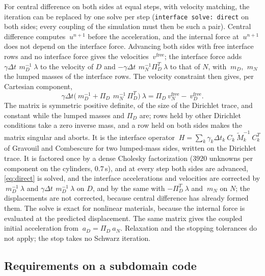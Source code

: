 \documentclass[11pt]{article}
\newcommand{\code}[1]{\texttt{#1}}
\begin{document}
For central difference on both sides at equal steps, with velocity
matching, the iteration can be replaced by one solve per step
(\code{interface solve: direct} on both sides; every coupling of the
simulation must then be such a pair). Central difference computes
$~u^{n+1}$ before the acceleration, and the internal force at $~u^{n+1}$
does not depend on the interface force. Advancing both sides with free
interface rows and no interface force gives the velocities
$~v^{\mathrm{free}}$; the interface force adds
$\gamma \Delta t\, ~m_D^{-1}~\lambda$ to the velocity of $D$ and
$-\gamma\Delta t\, ~m_N^{-1}\Pi_D^T ~\lambda$ to that of $N$, with $~m_D$,
$~m_N$ the lumped masses of the interface rows. The velocity constraint
then gives, per Cartesian component,
\begin{equation}
  \gamma \Delta t \bigl(~m_D^{-1} + \Pi_D\, ~m_N^{-1}\, \Pi_D^T\bigr)
  ~\lambda = \Pi_D ~v_N^{\mathrm{free}} - ~v_D^{\mathrm{free}} .
  \label{eq:direct}
\end{equation}
The matrix is symmetric positive definite, of the size of the Dirichlet
trace, and constant while the lumped masses and $\Pi_D$ are; rows held by
other Dirichlet conditions take a zero inverse mass, and a row held on
both sides makes the matrix singular and aborts. It is the interface
operator $~H = \sum_k \gamma_k \Delta t_k ~C_k \tilde{~M}_k^{-1} ~C_k^T$ of
Gravouil and Combescure for two lumped-mass sides, written on the Dirichlet
trace. It is factored once by a dense Cholesky factorization ($3920$
unknowns per component on the cylinders, $0.7$\,s), and at every step both
sides are advanced, \eqref{eq:direct} is solved, and the interface
accelerations and velocities are corrected by $~m_D^{-1} ~\lambda$ and
$\gamma \Delta t\, ~m_D^{-1} ~\lambda$ on $D$, and by the same with
$-\Pi_D^T ~\lambda$ and $~m_N$ on $N$; the displacements are not
corrected, because central difference has already formed them. The solve
is exact for nonlinear materials, because the internal force is evaluated
at the predicted displacement. The same matrix gives the coupled initial
acceleration from $~a_D = \Pi_D ~a_N$. Relaxation and the stopping
tolerances do not apply; the stop takes no Schwarz iteration.

\subsection{Requirements on a subdomain code}
\label{sec:integration}
\end{document}
